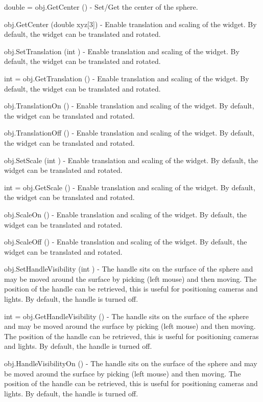 \begin{DoxyItemize}
\item {\ttfamily double = obj.\-Get\-Center ()} -\/ Set/\-Get the center of the sphere.  
\item {\ttfamily obj.\-Get\-Center (double xyz\mbox{[}3\mbox{]})} -\/ Enable translation and scaling of the widget. By default, the widget can be translated and rotated.  
\item {\ttfamily obj.\-Set\-Translation (int )} -\/ Enable translation and scaling of the widget. By default, the widget can be translated and rotated.  
\item {\ttfamily int = obj.\-Get\-Translation ()} -\/ Enable translation and scaling of the widget. By default, the widget can be translated and rotated.  
\item {\ttfamily obj.\-Translation\-On ()} -\/ Enable translation and scaling of the widget. By default, the widget can be translated and rotated.  
\item {\ttfamily obj.\-Translation\-Off ()} -\/ Enable translation and scaling of the widget. By default, the widget can be translated and rotated.  
\item {\ttfamily obj.\-Set\-Scale (int )} -\/ Enable translation and scaling of the widget. By default, the widget can be translated and rotated.  
\item {\ttfamily int = obj.\-Get\-Scale ()} -\/ Enable translation and scaling of the widget. By default, the widget can be translated and rotated.  
\item {\ttfamily obj.\-Scale\-On ()} -\/ Enable translation and scaling of the widget. By default, the widget can be translated and rotated.  
\item {\ttfamily obj.\-Scale\-Off ()} -\/ Enable translation and scaling of the widget. By default, the widget can be translated and rotated.  
\item {\ttfamily obj.\-Set\-Handle\-Visibility (int )} -\/ The handle sits on the surface of the sphere and may be moved around the surface by picking (left mouse) and then moving. The position of the handle can be retrieved, this is useful for positioning cameras and lights. By default, the handle is turned off.  
\item {\ttfamily int = obj.\-Get\-Handle\-Visibility ()} -\/ The handle sits on the surface of the sphere and may be moved around the surface by picking (left mouse) and then moving. The position of the handle can be retrieved, this is useful for positioning cameras and lights. By default, the handle is turned off.  
\item {\ttfamily obj.\-Handle\-Visibility\-On ()} -\/ The handle sits on the surface of the sphere and may be moved around the surface by picking (left mouse) and then moving. The position of the handle can be retrieved, this is useful for positioning cameras and lights. By default, the handle is turned off.  

\end{DoxyItemize}
